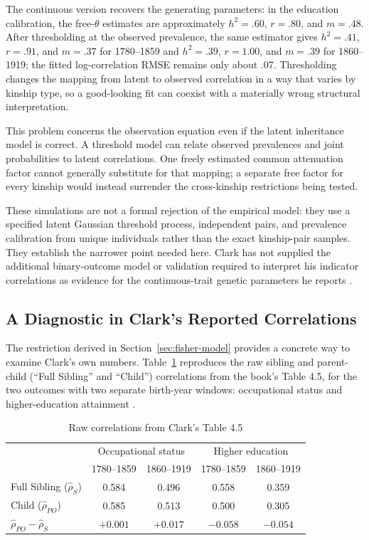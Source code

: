 The continuous version recovers the generating parameters: in the education
calibration, the free-$\theta$ estimates are approximately $h^2=.60$,
$r=.80$, and $m=.48$. After thresholding at the observed prevalence, the
same estimator gives $h^2=.41$, $r=.91$, and $m=.37$ for 1780--1859 and
$h^2=.39$, $r=1.00$, and $m=.39$ for 1860--1919; the fitted log-correlation
RMSE remains only about .07. Thresholding changes the
mapping from latent to observed correlation in a way that varies by kinship
type, so a good-looking fit can coexist with a materially wrong structural
interpretation.

This problem concerns the observation equation even if the latent
inheritance model is correct. A threshold model can relate observed
prevalences and joint probabilities to latent correlations. One freely
estimated common attenuation factor cannot generally substitute for that
mapping; a separate free factor for every kinship would instead surrender
the cross-kinship restrictions being tested.

These simulations are not a formal rejection of the empirical model: they
use a specified latent Gaussian threshold process, independent pairs, and
prevalence calibration from unique individuals rather than the exact
kinship-pair samples. They establish the narrower point needed here. Clark
has not supplied the additional binary-outcome model or validation required
to interpret his indicator correlations as evidence for the continuous-trait genetic parameters he reports \citep[Table~A1 and equations~A1--A3]{Clark2026}.
\subsection{A Diagnostic in Clark's Reported Correlations}

The restriction derived in Section~\ref{sec:fisher-model} provides a concrete
way to examine Clark's own numbers. Table~\ref{tab:table45} reproduces
the raw sibling and parent-child (``Full Sibling'' and ``Child'') correlations
from the book's Table 4.5, for the two outcomes with two separate birth-year windows: occupational status and higher-education attainment \citep[p.~54]{Clark2026}.

\begin{table}[h]
\centering
\caption{Raw correlations from Clark's Table 4.5}
\label{tab:table45}
\begin{tabular}{lcccc}
\hline
 & \multicolumn{2}{c}{Occupational status} & \multicolumn{2}{c}{Higher education} \\
 & 1780--1859 & 1860--1919 & 1780--1859 & 1860--1919 \\
\hline
Full Sibling ($\hat\rho_S$)      & 0.584 & 0.496 & 0.558 & 0.359 \\
Child ($\hat\rho_{PO}$)          & 0.585 & 0.513 & 0.500 & 0.305 \\
\hline
$\hat\rho_{PO}-\hat\rho_S$       & $+0.001$ & $+0.017$ & $-0.058$ & $-0.054$ \\
\hline
\end{tabular}
\end{table}

